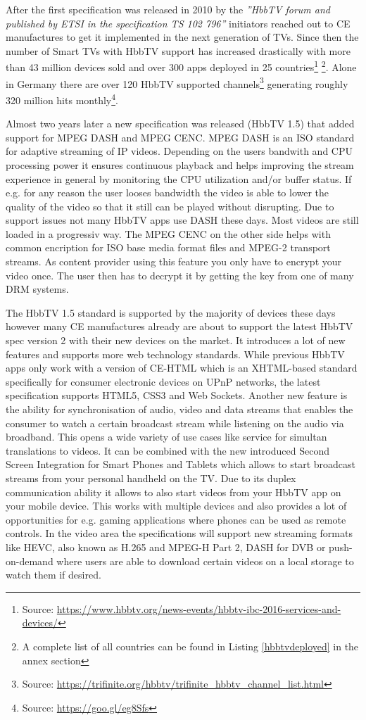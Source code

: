 After the first specification was released in 2010 by the \textit{''HbbTV forum and published by ETSI
in the specification TS 102 796''} \cite{evolution} initiators reached out to CE manufactures to get
it implemented in the next generation of TVs. Since then the number of Smart TVs with HbbTV support has
increased drastically with more than 43 million devices sold and over 300 apps deployed in 25
countries\footnote{Source: \url{https://www.hbbtv.org/news-events/hbbtv-ibc-2016-services-and-devices/}}
\footnote{A complete list of all countries can be found in Listing \ref{hbbtvdeployed} in the annex section}.
Alone in Germany there are over 120 HbbTV supported channels\footnote{Source: \url{https://trifinite.org/hbbtv/trifinite_hbbtv_channel_list.html}}
generating roughly 320 million hits monthly\footnote{Source: \url{https://goo.gl/eg8Sfs}}.

Almost two years later a new specification was released (HbbTV 1.5) that added support for MPEG DASH
and MPEG CENC. MPEG DASH is an ISO standard for adaptive streaming of IP videos. Depending on the
users bandwith and CPU processing power it ensures continuous playback and helps improving the stream
experience in general by monitoring the CPU utilization and/or buffer status. If e.g. for any reason
the user looses bandwidth the video is able to lower the quality of the video so that it still can
be played without disrupting. Due to support issues not many HbbTV apps use DASH these days.
Most videos are still loaded in a progressiv way. The MPEG CENC on the other side helps with common
encription for ISO base media format files and MPEG-2 transport streams. As content provider using this
feature you only have to encrypt your video once. The user then has to decrypt it by getting the
key from one of many DRM systems.

The HbbTV 1.5 standard is supported by the majority of devices these days however many CE manufactures
already are about to support the latest HbbTV spec version 2 with their new devices on the market.
It introduces a lot of new features and supports more web technology standards. While previous HbbTV
apps only work with a version of CE-HTML which is an XHTML-based standard specifically for consumer
electronic devices on UPnP networks, the latest specification supports HTML5, CSS3 and Web Sockets.
Another new feature is the ability for synchronisation of audio, video and data streams that enables
the consumer to watch a certain broadcast stream while listening on the audio via broadband. This
opens a wide variety of use cases like service for simultan translations to videos. It can be
combined with the new introduced Second Screen Integration for Smart Phones and Tablets which
allows to start broadcast streams from your personal handheld on the TV. Due to its duplex
communication ability it allows to also start videos from your HbbTV app on your mobile device.
This works with multiple devices and also provides a lot of opportunities for e.g. gaming applications
where phones can be used as remote controls. In the video area the specifications will support
new streaming formats like HEVC, also known as H.265 and MPEG-H Part 2, DASH for DVB or
push-on-demand where users are able to download certain videos on a local storage to watch them
if desired.

